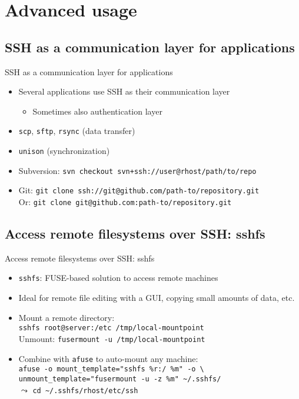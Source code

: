 \documentclass[11pt,final,usepdftitle=false]{beamer}
\newcommand{\tilda}{\textasciitilde{}}
\begin{document}
\section{Advanced usage}

\subsection{SSH as a communication layer for applications}
\begin{frame}{SSH as a communication layer for applications}
	\begin{itemize}
		\item Several applications use SSH as their communication layer\\
			\begin{itemize}
				\item Sometimes also authentication layer
			\end{itemize}
		\hbr
		\item \texttt{scp}, \texttt{sftp}, \texttt{rsync} (data transfer)
			\hbr
		\item \texttt{unison} (synchronization)
		\hbr

	\item \alert{Subversion:} \texttt{svn checkout svn+ssh://user@rhost/path/to/repo}
		\hbr
	\item \alert{Git:} \texttt{git clone ssh://git@github.com/path-to/repository.git}\\
	 Or: \texttt{git clone git@github.com:path-to/repository.git}
	\end{itemize}
\end{frame}

\subsection{Access remote filesystems over SSH: sshfs}
\begin{frame}[fragile]{Access remote filesystems over SSH: sshfs}
	\begin{itemize}
		\item \texttt{sshfs}: FUSE-based solution to access remote machines
			\hbr
	\item Ideal for remote file editing with a GUI, copying small amounts of data, etc.
			\hbr
		\item Mount a remote directory:\\
			\texttt{sshfs root@server:/etc /tmp/local-mountpoint}\\
			Unmount: \texttt{fusermount -u /tmp/local-mountpoint}
		\hbr
	\item Combine with \texttt{afuse} to auto-mount any machine:\\
	 \texttt{afuse -o mount\_template="sshfs \%r:/ \%m" -o \textbackslash \\
	 unmount\_template="fusermount -u -z \%m" \tilda/.sshfs/}\\[0.5em]
			$\leadsto$ \texttt{cd \tilda/.sshfs/rhost/etc/ssh}
	\end{itemize}
\end{frame}
\end{document}
